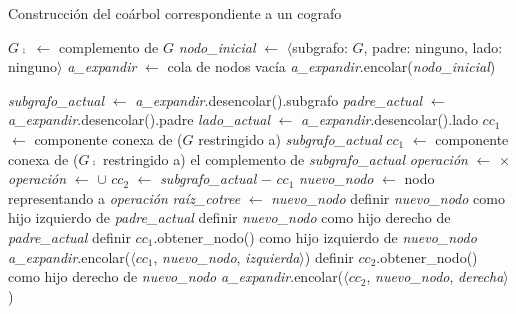 \bigskip
\begin{algorithm}[H]
    \SetAlgoVlined
    \caption{Construcción del coárbol correspondiente a un cografo}
    \label{alg:ex3:coarbol}

    $G\comp$ $\gets$ complemento de $G$ \;
    \textit{nodo\_inicial} $\gets$
    $\langle$subgrafo: $G$, padre: \textsf{ninguno}, lado: \textsf{ninguno}$\rangle$ \;
    \textit{a\_expandir} $\gets$ cola de nodos vacía \;
    \textit{a\_expandir}.encolar(\textit{nodo\_inicial}) \;

     {
        \textit{subgrafo\_actual} $\gets$ \textit{a\_expandir}.desencolar().subgrafo \;
        \textit{padre\_actual} $\gets$ \textit{a\_expandir}.desencolar().padre \;
        \textit{lado\_actual} $\gets$ \textit{a\_expandir}.desencolar().lado \;
        $cc_1$ $\gets$ componente conexa de ($G$ restringido a) \textit{subgrafo\_actual} \;
         {
            $cc_1$ $\gets$ componente conexa de ($G\comp$ restringido a) el complemento de \textit{subgrafo\_actual} \;
            \textit{operación} $\gets$ $\times$ \;
        } {
            \textit{operación} $\gets$ $\cup$ \;
        }
        $cc_2$ $\gets$ \textit{subgrafo\_actual} $-$ $cc_1$ \;
        \textit{nuevo\_nodo} $\gets$ nodo representando a \textit{operación} \;
         {
            \textit{raíz\_cotree} $\gets$ \textit{nuevo\_nodo} \;
        } {
             {
                definir \textit{nuevo\_nodo} como hijo izquierdo de \textit{padre\_actual} \;
            } {
                definir \textit{nuevo\_nodo} como hijo derecho de \textit{padre\_actual} \;
            }
        }
         {
            definir $cc_1$.obtener\_nodo() como hijo izquierdo de \textit{nuevo\_nodo} \;
        } {
            \textit{a\_expandir}.encolar($\langle cc_1$, \textit{nuevo\_nodo}, \textit{izquierda}$\rangle$) \;
        }
         {
            definir $cc_2$.obtener\_nodo() como hijo derecho de \textit{nuevo\_nodo} \;
        } {
            \textit{a\_expandir}.encolar($\langle cc_2$, \textit{nuevo\_nodo}, \textit{derecha}$\rangle$) \;
        }
    }
\end{algorithm}
\bigskip

